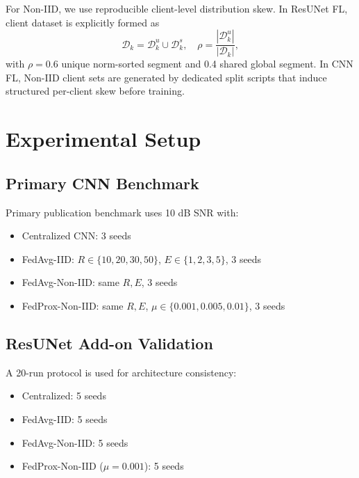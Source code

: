 \documentclass{llncs}
\begin{document}
For Non-IID, we use reproducible client-level distribution skew. In ResUNet FL, client dataset is explicitly formed as
\begin{equation}
\mathcal{D}_k=\mathcal{D}_k^u \cup \mathcal{D}_k^s,\quad \rho=\frac{|\mathcal{D}_k^u|}{|\mathcal{D}_k|},
\end{equation}
with $\rho=0.6$ unique norm-sorted segment and 0.4 shared global segment. In CNN FL, Non-IID client sets are generated by dedicated split scripts that induce structured per-client skew before training.


\section{Experimental Setup}
\subsection{Primary CNN Benchmark}
Primary publication benchmark uses 10 dB SNR with:
\begin{itemize}
    \item Centralized CNN: 3 seeds
    \item FedAvg-IID: $R\in\{10,20,30,50\}$, $E\in\{1,2,3,5\}$, 3 seeds
    \item FedAvg-Non-IID: same $R,E$, 3 seeds
    \item FedProx-Non-IID: same $R,E$, $\mu\in\{0.001,0.005,0.01\}$, 3 seeds
\end{itemize}

\subsection{ResUNet Add-on Validation}
A 20-run protocol is used for architecture consistency:
\begin{itemize}
    \item Centralized: 5 seeds
    \item FedAvg-IID: 5 seeds
    \item FedAvg-Non-IID: 5 seeds
    \item FedProx-Non-IID ($\mu=0.001$): 5 seeds
\end{itemize}
\end{document}
